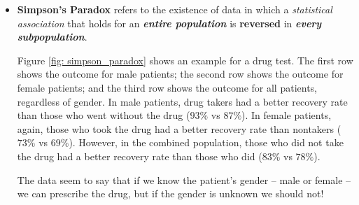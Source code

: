 \documentclass[11pt]{article}
\begin{document}
\begin{itemize}
\item \textbf{Simpson's Paradox}  refers to the existence of data in which a \emph{statistical association} that holds for an \emph{\textbf{entire population}} is \textbf{reversed} in \emph{\textbf{every subpopulation}}.

Figure \ref{fig: simpson_paradox} shows an example for a drug test. The first row shows the outcome for male patients; the second row shows the outcome for
female patients; and the third row shows the outcome for all patients, regardless of gender. In male patients, drug takers had a better recovery rate than those who went without the drug ($93\%$ vs $87\%$). In female patients, again, those who took the drug had a better recovery rate than nontakers ($73\%$ vs $69\%$). However, in the combined population, those who did not take the drug had a better recovery rate than those who did ($83\%$ vs $78\%$).

The data seem to say that if we know the patient’s gender -- male or female -- we can prescribe the drug, but if the gender is unknown we should not! 


\end{itemize}
\end{document}
